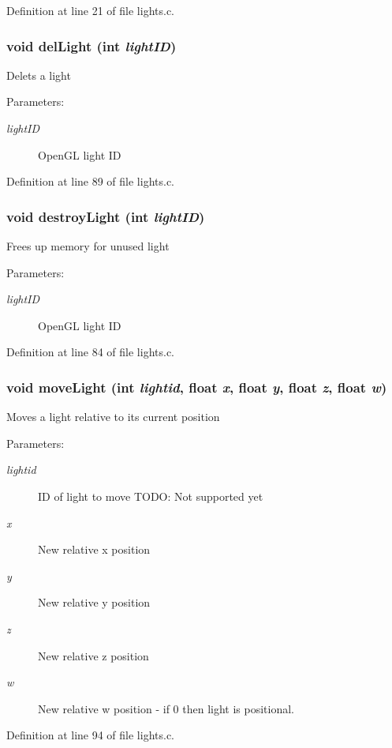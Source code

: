Definition at line 21 of file lights.c.
\subsubsection{\setlength{\rightskip}{0pt plus 5cm}void del\-Light (int {\em light\-ID})}\label{lights_8h_a2}


Delets a light

\begin{Desc}
\item[Parameters:]
\begin{description}
\item[{\em light\-ID}]Open\-GL light ID \end{description}
\end{Desc}


Definition at line 89 of file lights.c.
\subsubsection{\setlength{\rightskip}{0pt plus 5cm}void destroy\-Light (int {\em light\-ID})}\label{lights_8h_a1}


Frees up memory for unused light

\begin{Desc}
\item[Parameters:]
\begin{description}
\item[{\em light\-ID}]Open\-GL light ID \end{description}
\end{Desc}


Definition at line 84 of file lights.c.
\subsubsection{\setlength{\rightskip}{0pt plus 5cm}void move\-Light (int {\em lightid}, float {\em x}, float {\em y}, float {\em z}, float {\em w})}\label{lights_8h_a3}


Moves a light relative to its current position

\begin{Desc}
\item[Parameters:]
\begin{description}
\item[{\em lightid}]ID of light to move TODO: Not supported yet \item[{\em x}]New relative x position \item[{\em y}]New relative y position \item[{\em z}]New relative z position \item[{\em w}]New relative w position - if 0 then light is positional. \end{description}
\end{Desc}


Definition at line 94 of file lights.c.